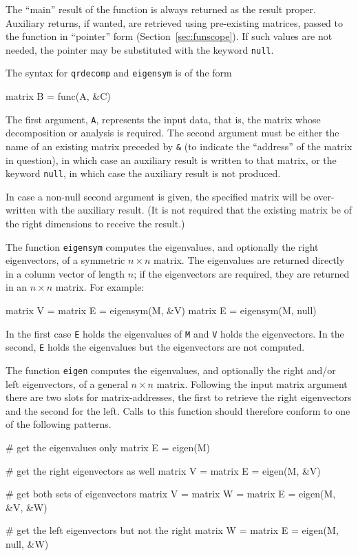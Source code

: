The ``main'' result of the function is always returned as the result
proper. Auxiliary returns, if wanted, are retrieved using pre-existing
matrices, passed to the function in ``pointer'' form
(Section~\ref{sec:funscope}). If such values are not needed, the
pointer may be substituted with the keyword \texttt{null}.

The syntax for \texttt{qrdecomp} and \texttt{eigensym} is of the form
%
\begin{code}
matrix B = func(A, &C)
\end{code}
%
The first argument, \texttt{A}, represents the input data, that is,
the matrix whose decomposition or analysis is required.  The second
argument must be either the name of an existing matrix preceded by
\verb+&+ (to indicate the ``address'' of the matrix in question), in
which case an auxiliary result is written to that matrix, or the
keyword \texttt{null}, in which case the auxiliary result is not
produced.

In case a non-null second argument is given, the specified matrix will
be over-written with the auxiliary result.  (It is not required that
the existing matrix be of the right dimensions to receive the result.)

The function \texttt{eigensym} computes the eigenvalues, and
optionally the right eigenvectors, of a symmetric $n \times n$ matrix.
The eigenvalues are returned directly in a column vector of length
$n$; if the eigenvectors are required, they are returned in an $n
\times n$ matrix.  For example:
%
\begin{code}
matrix V = {}
matrix E = eigensym(M, &V)
matrix E = eigensym(M, null)
\end{code}
%
In the first case \texttt{E} holds the eigenvalues of \texttt{M} and
\texttt{V} holds the eigenvectors.  In the second, \texttt{E} holds
the eigenvalues but the eigenvectors are not computed.

The function \texttt{eigen} computes the eigenvalues, and optionally
the right and/or left eigenvectors, of a general $n \times n$
matrix. Following the input matrix argument there are two slots for
matrix-addresses, the first to retrieve the right eigenvectors and the
second for the left.  Calls to this function should therefore conform
to one of the following patterns.
\begin{code}
# get the eigenvalues only
matrix E = eigen(M)

# get the right eigenvectors as well
matrix V = {}
matrix E = eigen(M, &V)

# get both sets of eigenvectors
matrix V = {}
matrix W = {}
matrix E = eigen(M, &V, &W)

# get the left eigenvectors but not the right
matrix W = {}
matrix E = eigen(M, null, &W)
\end{code}

